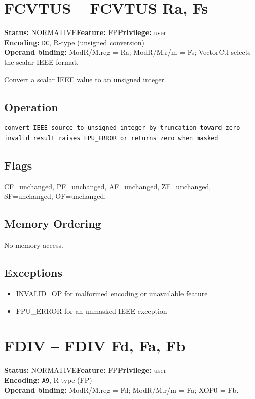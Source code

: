 \documentclass[10pt]{article}
\begin{document}
\section{FCVTUS -- FCVTUS Ra, Fs}
\textbf{Status:} NORMATIVE\quad \textbf{Feature:} FP\quad \textbf{Privilege:} user\\
\textbf{Encoding:} \texttt{DC}, R-type (unsigned conversion)\\
\textbf{Operand binding:} ModR/M.reg = Ra; ModR/M.r/m = Fs; VectorCtl selects the scalar IEEE format.

Convert a scalar IEEE value to an unsigned integer.

\subsection*{Operation}
\begin{lstlisting}
convert IEEE source to unsigned integer by truncation toward zero
invalid result raises FPU_ERROR or returns zero when masked
\end{lstlisting}
\subsection*{Flags}
CF=unchanged, PF=unchanged, AF=unchanged, ZF=unchanged, SF=unchanged, OF=unchanged.
\subsection*{Memory Ordering}
No memory access.
\subsection*{Exceptions}
\begin{itemize}
\item INVALID\_OP for malformed encoding or unavailable feature
\item FPU\_ERROR for an unmasked IEEE exception
\end{itemize}
\clearpage

\section{FDIV -- FDIV Fd, Fa, Fb}
\textbf{Status:} NORMATIVE\quad \textbf{Feature:} FP\quad \textbf{Privilege:} user\\
\textbf{Encoding:} \texttt{A9}, R-type (FP)\\
\textbf{Operand binding:} ModR/M.reg = Fd; ModR/M.r/m = Fa; XOP0 = Fb.
\end{document}
